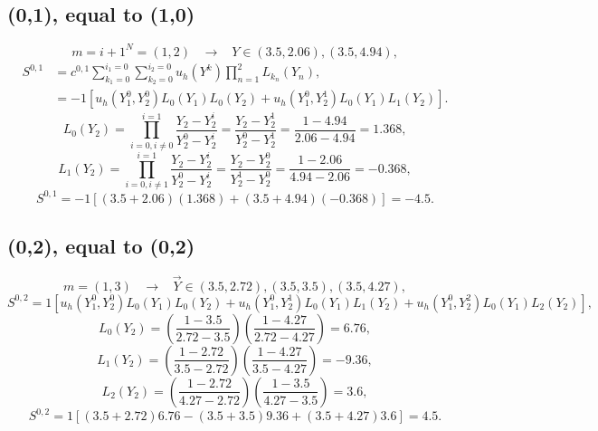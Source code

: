 \documentclass[11pt]{article}
\begin{document}
\subsection{(0,1), equal to (1,0)}
\begin{equation}
m=i+{1}^N = (1,2) \hspace{10pt} \to \hspace{10pt} Y\in(3.5,2.06),(3.5,4.94),
\end{equation}
\begin{align}
S^{0,1}&=c^{0,1}\sum_{k_1=0}^{i_1=0}\sum_{k_2=0}^{i_2=0}u_h(Y^k)\prod_{n=1}^2 L_{k_n}(Y_n),\\
  &= -1\left[u_h(Y^0_1,Y^0_2)L_0(Y_1)L_0(Y_2)+u_h(Y^0_1,Y^1_2)L_0(Y_1)L_1(Y_2) \right].
\end{align}
\begin{equation}
L_0(Y_2) = \prod_{i=0,i\neq0}^{i=1} \frac{Y_2-Y_2^i}{Y_2^0-Y_2^i}=\frac{Y_2-Y_2^1}{Y_2^0-Y_2^1}=\frac{1-4.94}{2.06-4.94}=1.368,
\end{equation}
\begin{equation}
L_1(Y_2) = \prod_{i=0,i\neq1}^{i=1} \frac{Y_2-Y_2^i}{Y_2^0-Y_2^i}=\frac{Y_2-Y_2^0}{Y_2^1-Y_2^0}=\frac{1-2.06}{4.94-2.06}=-0.368,
\end{equation}
\begin{equation}
S^{0,1}=-1\left[(3.5+2.06)(1.368)+(3.5+4.94)(-0.368)\right]=-4.5.
\end{equation}

\subsection{(0,2), equal to (0,2)}
\begin{equation}
m=(1,3) \hspace{10pt} \to \hspace{10pt} \vec Y\in (3.5,2.72),(3.5,3.5),(3.5,4.27),
\end{equation}
\begin{equation}
S^{0,2}=1[u_h(Y^0_1,Y^0_2)L_0(Y_1)L_0(Y_2) + u_h(Y^0_1,Y^1_2)L_0(Y_1)L_1(Y_2) + u_h(Y^0_1,Y^2_2)L_0(Y_1)L_2(Y_2)],
\end{equation}
\begin{equation}
L_0(Y_2)=\left(\frac{1-3.5}{2.72-3.5}\right)\left(\frac{1-4.27}{2.72-4.27}\right)=6.76,
\end{equation}
\begin{equation}
L_1(Y_2)=\left(\frac{1-2.72}{3.5-2.72}\right)\left(\frac{1-4.27}{3.5-4.27}\right)=-9.36,
\end{equation}
\begin{equation}
L_2(Y_2)=\left(\frac{1-2.72}{4.27-2.72}\right)\left(\frac{1-3.5}{4.27-3.5}\right)=3.6,
\end{equation}
\begin{equation}
S^{0,2}=1\left[(3.5+2.72)6.76 - (3.5+3.5)9.36 + (3.5+4.27)3.6\right]=4.5.
\end{equation}
\end{document}
